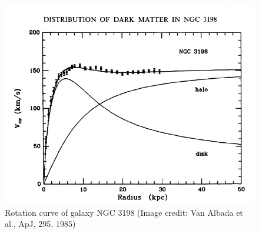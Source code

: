 \begin{figure}[ht]
\begin{center}
\includegraphics[scale=0.55]{Draw/lec10_4.png}
\end{center}
\caption{Rotation curve of galaxy NGC 3198 (Image credit: Van Albada et al., ApJ, 295, 1985)}
\label{fig:lec10_4}
\end{figure}


